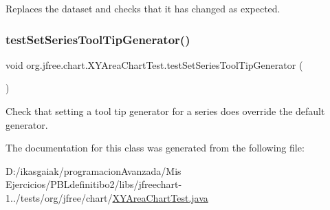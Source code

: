 Replaces the dataset and checks that it has changed as expected. \mbox{\label{classorg_1_1jfree_1_1chart_1_1_x_y_area_chart_test_ad016f7ec093632c08651b6fb73e82e8a}} 
\subsubsection{\texorpdfstring{test\+Set\+Series\+Tool\+Tip\+Generator()}{testSetSeriesToolTipGenerator()}}
{\footnotesize\ttfamily void org.\+jfree.\+chart.\+X\+Y\+Area\+Chart\+Test.\+test\+Set\+Series\+Tool\+Tip\+Generator (\begin{DoxyParamCaption}{ }\end{DoxyParamCaption})}

Check that setting a tool tip generator for a series does override the default generator. 

The documentation for this class was generated from the following file\+:\begin{DoxyCompactItemize}
\item 
D\+:/ikasgaiak/programacion\+Avanzada/\+Mis Ejercicios/\+P\+B\+Ldefinitibo2/libs/jfreechart-\/1../tests/org/jfree/chart/\mbox{\hyperlink{_x_y_area_chart_test_8java}{X\+Y\+Area\+Chart\+Test.\+java}}\end{DoxyCompactItemize}
